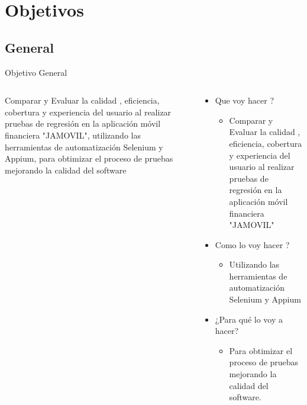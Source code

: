 \documentclass{beamer}
\begin{document}
\section{Objetivos}
\subsection{General}
\begin{frame}{Objetivo General }
  \begin{columns}
    \begin{column}{0.5\textwidth}
     Comparar y Evaluar la calidad , eficiencia, cobertura y experiencia del usuario al realizar pruebas de regresión en la aplicación móvil financiera "JAMOVIL", utilizando las herramientas de automatización Selenium y Appium, para obtimizar el proceso de pruebas mejorando la calidad del software
   
    \end{column}
    \begin{column}{0.5\textwidth}
      \begin{itemize}
          \item Que voy hacer ?
          \begin{itemize}
              \item Comparar y Evaluar la calidad , eficiencia, cobertura y experiencia del usuario al realizar pruebas de regresión en la aplicación móvil financiera "JAMOVIL"
          \end{itemize}
          \item Como lo voy hacer ?
          \begin{itemize}
              \item Utilizando las herramientas de automatización Selenium y Appium
          \end{itemize}
          \item ¿Para qué lo voy a hacer?
           \begin{itemize}
              \item Para obtimizar el proceso de pruebas mejorando la calidad del software.
          \end{itemize}         
          \end{itemize}
    \end{column}
  \end{columns}
\end{frame}
\end{document}
